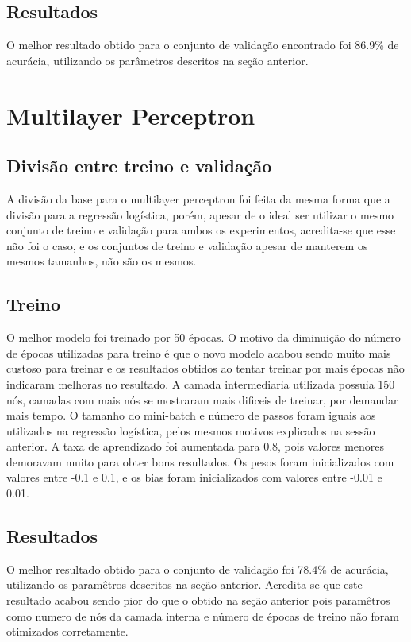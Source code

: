 \documentclass[conference]{IEEEtran}
\begin{document}
\subsection{Resultados}
O melhor resultado obtido para o conjunto de validação encontrado foi 86.9\% de acurácia, utilizando os parâmetros descritos na seção anterior.

\section{Multilayer Perceptron}

\subsection{Divisão entre treino e validação}
A divisão da base para o multilayer perceptron foi feita da mesma forma que a divisão para a regressão logística, porém, apesar de o ideal ser utilizar o mesmo conjunto de treino e validação para ambos os experimentos, acredita-se que esse não foi o caso, e os conjuntos de treino e validação apesar de manterem os mesmos tamanhos, não são os mesmos.

\subsection{Treino}
O melhor modelo foi treinado por 50 épocas. O motivo da diminuição do número de épocas utilizadas para treino é que o novo modelo acabou sendo muito mais custoso para treinar e os resultados obtidos ao tentar treinar por mais épocas não indicaram melhoras no resultado. A camada intermediaria utilizada possuia 150 nós, camadas com mais nós se mostraram mais dificeis de treinar, por demandar mais tempo. O tamanho do mini-batch e número de passos foram iguais aos utilizados na regressão logística, pelos mesmos motivos explicados na sessão anterior. A taxa de aprendizado foi aumentada para 0.8, pois valores menores demoravam muito para obter bons resultados. Os pesos foram inicializados com valores entre -0.1 e 0.1, e os bias foram inicializados com valores entre -0.01 e 0.01.

\subsection{Resultados}
O melhor resultado obtido para o conjunto de validação foi 78.4\% de acurácia, utilizando os paramêtros descritos na seção anterior. Acredita-se que este resultado acabou sendo pior do que o obtido na seção anterior pois paramêtros como numero de nós da camada interna e número de épocas de treino não foram otimizados corretamente.
\end{document}
